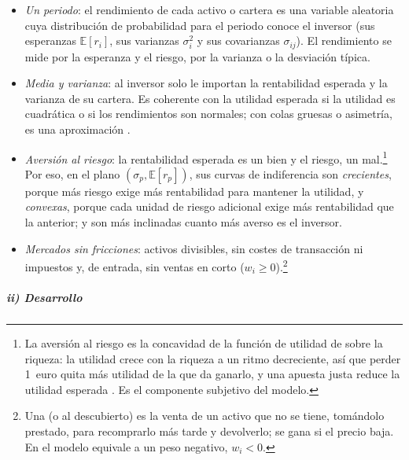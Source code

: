 \documentclass[11pt]{article}
\begin{document}
\begin{itemize}
\item \emph{Un periodo}: el rendimiento de cada activo o cartera es una variable aleatoria cuya distribución de probabilidad para el periodo conoce el inversor (sus esperanzas $\mathbb{E}[r_i]$, sus varianzas $\sigma_i^2$ y sus covarianzas $\sigma_{ij}$). El rendimiento se mide por la esperanza y el riesgo, por la varianza o la desviación típica.
\item \emph{Media y varianza}: al inversor solo le importan la rentabilidad esperada y la varianza de su cartera. Es coherente con la utilidad esperada si la utilidad es cuadrática o si los rendimientos son normales; con colas gruesas o asimetría, es una aproximación .
\item \emph{Aversión al riesgo}: la rentabilidad esperada es un bien y el riesgo, un mal.\footnote{La aversión al riesgo es la concavidad de la función de utilidad de  sobre la riqueza: la utilidad crece con la riqueza a un ritmo decreciente, así que perder 1~euro quita más utilidad de la que da ganarlo, y una apuesta justa reduce la utilidad esperada . Es el componente subjetivo del modelo.} Por eso, en el plano $(\sigma_p,\mathbb{E}[r_p])$, sus curvas de indiferencia son \emph{crecientes}, porque más riesgo exige más rentabilidad para mantener la utilidad, y \emph{convexas}, porque cada unidad de riesgo adicional exige más rentabilidad que la anterior; y son más inclinadas cuanto más averso es el inversor.
\item \emph{Mercados sin fricciones}: activos divisibles, sin costes de transacción ni impuestos y, de entrada, sin ventas en corto ($w_i\geq0$).\footnote{Una  (o al descubierto) es la venta de un activo que no se tiene, tomándolo prestado, para recomprarlo más tarde y devolverlo; se gana si el precio baja. En el modelo equivale a un peso negativo, $w_i<0$.}
\end{itemize}

\subparagraph{ii) Desarrollo}
\end{document}

